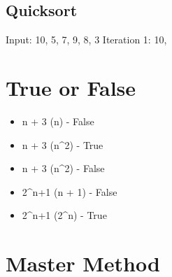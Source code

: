 \documentclass{article}
\begin{document}
\subsection{Quicksort}
Input: {10, 5, 7, 9, 8, 3}
Iteration 1: {10, }

\section{True or False}

\begin{itemize}

\item n + 3 \in \Omega(n) - False

\item n + 3 \in \Omega(n^2) - True

\item n + 3 \in \Theta(n^{2}) - False

\item 2^{n+1} \in {}(n + 1) - False

\item 2^{n+1} \in \Theta(2^{n}) - True

\end{itemize}

\section{Master Method}
\end{document}
